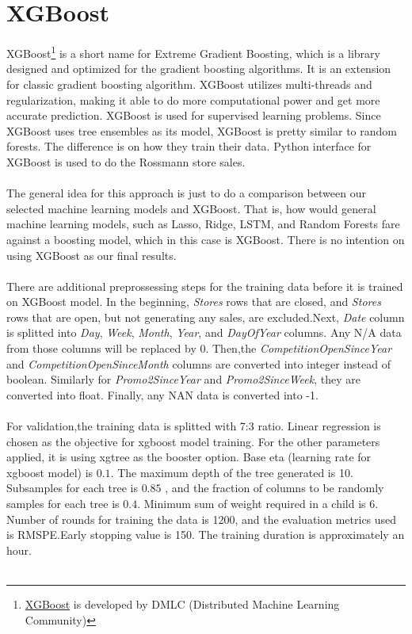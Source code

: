 \section{XGBoost}
XGBoost\footnote{\href{https:https://github.com/dmlc/xgboost}{XGBoost} is developed by DMLC (Distributed Machine Learning Community)} is a short name for Extreme Gradient Boosting, which is a library designed and optimized for the gradient boosting algorithms. It is an extension for classic gradient boosting algorithm. XGBoost utilizes multi-threads and regularization, making it able to do more computational power and get more accurate prediction. XGBoost is used for supervised learning problems. Since XGBoost uses tree ensembles as its model, XGBoost is pretty similar to random forests. The difference is on how they train their data. Python interface for XGBoost is used to do the Rossmann store sales. \\ \\
The general idea for this approach is just to do a comparison between our selected machine learning models and XGBoost. That is, how would general machine learning models, such as Lasso, Ridge, LSTM, and Random Forests fare against a boosting model, which in this case is XGBoost. There is no intention on using XGBoost as our final results.\\ \\
There are additional preprossessing steps for the training data before it is trained on XGBoost model. In the beginning, \textit{Stores} rows that are closed, and \textit{Stores} rows that are open, but not generating any sales, are excluded.Next, \textit{Date} column is splitted into \textit{Day}, \textit{Week}, \textit{Month}, \textit{Year}, and \textit{DayOfYear} columns. Any N/A data from those columns will be replaced by 0. Then,the \textit{CompetitionOpenSinceYear} and \textit{CompetitionOpenSinceMonth} columns are converted into integer instead of boolean. Similarly for \textit{Promo2SinceYear} and \textit{Promo2SinceWeek}, they are converted into float. Finally, any NAN data is converted into -1. \\ \\
For validation,the training data is splitted with 7:3 ratio. Linear regression is chosen as the objective for xgboost model training. For the other parameters applied, it is using xgtree as the booster option. Base eta (learning rate for xgboost model) is $0.1$. The maximum depth of the tree generated is 10. Subsamples for each tree is $0.85$ , and the fraction of columns to be randomly samples for each tree is $0.4$. Minimum sum of weight required in a child is 6. Number of rounds for training the data is 1200, and the evaluation metrics used is RMSPE.Early stopping value is 150. The training duration is approximately an hour.\\ \\ 
